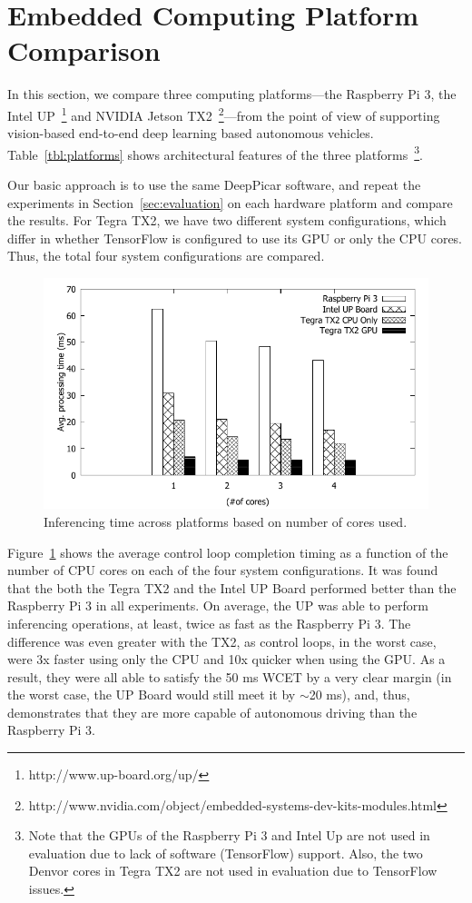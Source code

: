 
%

\section{Embedded Computing Platform Comparison}\label{sec:comparison}

In this section, we compare three computing platforms---the Raspberry
Pi 3, the Intel UP~\footnote{http://www.up-board.org/up/} and NVIDIA
Jetson
TX2~\footnote{http://www.nvidia.com/object/embedded-systems-dev-kits-modules.html}---from
the point of view of supporting vision-based end-to-end deep learning
based autonomous vehicles. 
Table~\ref{tbl:platforms} shows architectural features of the three
platforms~\footnote{Note that the GPUs of the Raspberry Pi 3 and Intel
  Up are not used in evaluation due to lack of software (TensorFlow)
support. Also, the two Denvor cores in Tegra TX2 are not used in
evaluation due to TensorFlow issues.}.
  
Our basic approach is to use the same DeepPicar software, and repeat
the experiments in Section~\ref{sec:evaluation} on each hardware
platform and compare the results. 
For Tegra TX2, we have two different system configurations,
which differ in whether TensorFlow is configured to use its GPU or
only the CPU cores. Thus, the total four system configurations are
compared.

\begin{figure}[h]
  \centering
  \includegraphics[width=.5\textwidth]{figs/compare_core}
  \caption{Inferencing time across platforms based on number of cores 
used.}
  \label{fig:sys_core}
\end{figure}

Figure~\ref{fig:sys_core} shows the average control loop completion
timing as a function of the number of CPU cores on each of the four
system configurations.
It was found that the both the Tegra TX2 
and the Intel UP Board performed better than the Raspberry Pi 3 in 
all experiments. On average, the UP was able to perform inferencing 
operations, at least, twice as fast as the Raspberry Pi 3. The 
difference was even greater with the TX2, as control loops, in the 
worst case, were 3x faster using only the CPU and 10x quicker when 
using the GPU. As a result, they were all able to satisfy the 50 ms 
WCET by a very clear margin (in the worst case, the UP Board would 
still meet it by $\sim$20 ms), and, thus, demonstrates that they are 
more capable of autonomous driving than the Raspberry Pi 3.


